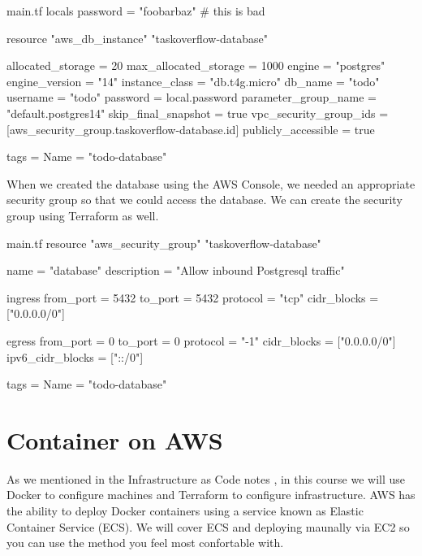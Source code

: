 \documentclass{csse4400}
\begin{document}
\begin{code}[language=terraform,numbers=none]{main.tf}
locals {
  password = "foobarbaz" # this is bad
}

resource "aws_db_instance" "taskoverflow-database" {
  allocated_storage      = 20
  max_allocated_storage  = 1000
  engine                 = "postgres"
  engine_version         = "14"
  instance_class         = "db.t4g.micro"
  db_name                = "todo"
  username               = "todo"
  password               = local.password
  parameter_group_name   = "default.postgres14"
  skip_final_snapshot    = true
  vpc_security_group_ids = [aws_security_group.taskoverflow-database.id]
  publicly_accessible    = true

  tags = {
    Name = "todo-database"
  }
}
\end{code}

When we created the database using the AWS Console,
we needed an appropriate security group so that we could access the database.
We can create the security group using Terraform as well.

\begin{code}[language=terraform,numbers=none]{main.tf}
resource "aws_security_group" "taskoverflow-database" {
  name        = "database"
  description = "Allow inbound Postgresql traffic"

  ingress {
    from_port        = 5432
    to_port          = 5432
    protocol         = "tcp"
    cidr_blocks      = ["0.0.0.0/0"]
  }

  egress {
    from_port        = 0
    to_port          = 0
    protocol         = "-1"
    cidr_blocks      = ["0.0.0.0/0"]
    ipv6_cidr_blocks = ["::/0"]
  }

  tags = {
    Name = "todo-database"
  }
}
\end{code}


\section{Container on AWS}

As we mentioned in the Infrastructure as Code notes \cite{iac-notes},
in this course we will use Docker to configure machines and Terraform to configure infrastructure.
AWS has the ability to deploy Docker containers using a service known as Elastic Container Service (ECS). We will cover ECS and deploying maunally via EC2 so you can use the method you feel most confortable with.
\end{document}
